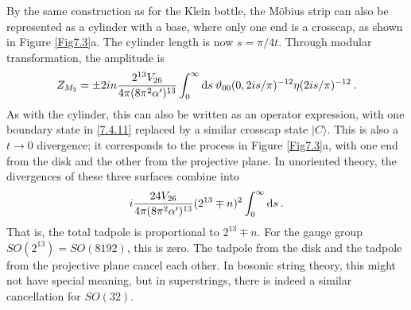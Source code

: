 By the same construction as for the Klein bottle, the M\"{o}bius strip can also be represented as a cylinder with a base, where only one end is a crosscap, as shown in Figure \ref{Fig7.3}a. The cylinder length is now $s=\pi / 4 t$. 
Through modular transformation, the amplitude is 
\begin{equation}
	Z_{M_{2}}=\pm 2 i n \frac{2^{13} V_{26}}{4 \pi(8 \pi^{2} \alpha^{\prime})^{13}}
	\int_{0}^{\infty} \mathrm{d} s \: \vartheta_{00}(0,2 i s / \pi)^{-12} \eta(2 i s / \pi)^{-12} \:. \label{7.4.23} 
\end{equation}
As with the cylinder, this can also be written as an operator expression, with one boundary state in \eqref{7.4.11} replaced by a similar crosscap state $|C\rangle $. This is also a $t \rightarrow 0$ divergence; it corresponds to the process in Figure \ref{Fig7.3}a, with one end from the disk and the other from the projective plane. 
In unoriented theory, the divergences of these three surfaces combine into %
\begin{equation}
	\mi \frac{24 V_{26}}{4 \pi(8 \pi^{2} \alpha^{\prime})^{13}}(2^{13} \mp n)^{2} \int_{0}^{\infty} \dif s\:. \label{7.4.24} %
\end{equation}
That is, the total tadpole is proportional to $2^{13} \mp n $. %
For the gauge group $SO(2^{13})=S O(8192)$, this is zero. The tadpole from the disk and the tadpole from the projective plane cancel each other. In bosonic string theory, this might not have special meaning, but in superstrings, there is indeed a similar cancellation for $SO(32)$. %